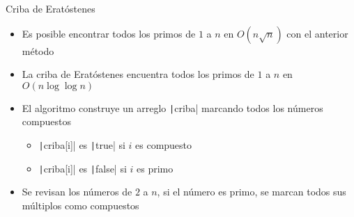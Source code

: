 \documentclass[10pt]{beamer}
\newcommand{\bi}{\begin{itemize}}
\newcommand{\ei}{\end{itemize}}
\begin{document}
\begin{frame}{Criba de Eratóstenes}
  \bi
    \item Es posible encontrar todos los primos de $1$ a $n$ en $O(n \sqrt{n})$ con el anterior método
    \item La criba de Eratóstenes encuentra todos los primos de $1$ a $n$ en $O(n \log \log n)$
    
    \vspace{20pt}

    \item<2-> El algoritmo construye un arreglo \texttt|criba| marcando todos los números compuestos
    \bi
      \item<2-> \texttt|criba[i]| es \texttt|true| si $i$ es compuesto
      \item<2-> \texttt|criba[i]| es \texttt|false| si $i$ es primo
    \ei
    \item<3-> Se revisan los números de $2$ a $n$, si el número es primo, se marcan todos sus múltiplos como compuestos
  \ei
\end{frame}
\end{document}
